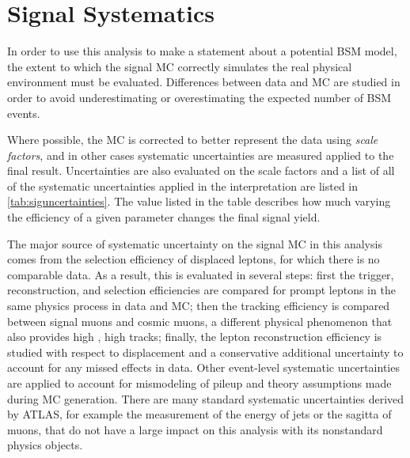 \chapter{Signal Systematics}

In order to use this analysis to make a statement about a potential \ac{BSM} model, the extent to which the signal \ac{MC} correctly simulates the real physical environment must be evaluated. Differences between data and \ac{MC} are studied in order to avoid underestimating or overestimating the expected number of \ac{BSM} events. 

Where possible, the \ac{MC} is corrected to better represent the data using \emph{scale factors}, and in other cases systematic uncertainties are measured applied to the final result. Uncertainties are also evaluated on the scale factors and a list of all of the systematic uncertainties applied in the interpretation are listed in \autoref{tab:siguncertainties}. The value listed in the table describes how much varying the efficiency of a given parameter changes the final signal yield. 

The major source of systematic uncertainty on the signal \ac{MC} in this analysis comes from the selection efficiency of displaced leptons, for which there is no comparable data. As a result, this is evaluated in several steps: first the trigger, reconstruction, and selection efficiencies are compared for prompt leptons in the same physics process in data and \ac{MC}; then the tracking efficiency is compared between signal muons and cosmic muons, a different physical phenomenon that also provides high \pt, high \absdz tracks; finally, the lepton reconstruction efficiency is studied with respect to displacement and a conservative additional uncertainty to account for any missed effects in data. Other event-level systematic uncertainties are applied to account for mismodeling of pileup and theory assumptions made during \ac{MC} generation. There are many standard systematic uncertainties derived by \ac{ATLAS}, for example the measurement of the energy of jets or the sagitta of muons, that do not have a large impact on this analysis with its nonstandard physics objects.


